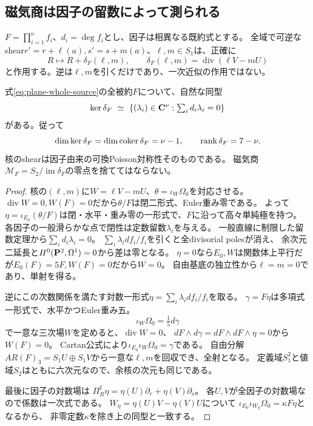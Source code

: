 \subsection{磁気商は因子の留数によって測られる}
$F=\prod_{i=1}^{\nu}f_i$、$d_i=\deg f_i$とし、因子は相異なる既約式とする。
全域で可逆なshear$r'=r+\ell(a),s'=s+m(a)$、$\ell,m\in S_1$は、正確に
\[
 R\longmapsto R+\delta_F(\ell,m),\qquad
 \delta_F(\ell,m)=\operatorname{div}(\ell V-mU)
\]
と作用する。逆は$\ell,m$を引くだけであり、一次近似の作用ではない。
\begin{theorem}[磁気shearの核と因子留数]\label{thm:magnetic-residue-quotient}
式\eqref{eq:plane-whole-source}の全被約$F$について、自然な同型
\begin{equation}
 \ker\delta_F\ \simeq\
 \{(\lambda_i)\in\mathbf C^\nu:\textstyle\sum_i d_i\lambda_i=0\}
                                                        \label{eq:magnetic-residues}
\end{equation}
がある。従って
\[
 \dim\ker\delta_F=\dim\operatorname{coker}\delta_F=\nu-1,
 \qquad\operatorname{rank}\delta_F=7-\nu.
\]
核のshearは因子由来の可換Poisson対称性そのものである。
磁気商$\mathcal M_F=S_2/\operatorname{im}\delta_F$の零点を捨ててはならない。
\end{theorem}
\begin{proof}
核の$(\ell,m)$に$W=\ell V-mU$、$\theta=\iota_W\Omega_0$を対応させる。
$\operatorname{div}W=0,W(F)=0$だから$\theta/F$は閉二形式、Euler重み零である。
よって$\eta=\iota_{E_0}(\theta/F)$は閉・水平・重み零の一形式で、$F$に沿って高々単純極を持つ。
各因子の一般滑らかな点で閉性は定数留数$\lambda_i$を与える。
一般直線に制限した留数定理から$\sum_i d_i\lambda_i=0$。
$\sum_i\lambda_i df_i/f_i$を引くと全divisorial polesが消え、
余次元二延長と$H^0(\mathbf P^2,\Omega^1)=0$から差は零となる。
$\eta=0$なら$E_0,W$は関数体上平行だが$E_0(F)=5F,W(F)=0$だから$W=0$。
自由基底の独立性から$\ell=m=0$であり、単射を得る。

逆にこの次数関係を満たす対数一形式$\eta=\sum_i\lambda_i df_i/f_i$を取る。
$\gamma=F\eta$は多項式一形式で、水平かつEuler重み五。
\[
 \iota_W\Omega_0=\tfrac15d\gamma
\]
で一意な三次場$W$を定めると、$\operatorname{div}W=0$、
$dF\wedge d\gamma=dF\wedge dF\wedge\eta=0$から$W(F)=0$。
Cartan公式により$\iota_{E_0}\iota_W\Omega_0=\gamma$である。
自由分解$AR(F)_3=S_1U\oplus S_1V$から一意な$\ell,m$を回収でき、全射となる。
定義域$S_1^2$と値域$S_2$はともに六次元なので、余核の次元も同じである。

最後に因子の対数場は
$\Pi_R^\sharp\eta=\eta(U)\partial_r+\eta(V)\partial_s$。
各$U,V$が全因子の対数場なので係数は一次式である。
$W_\eta=\eta(U)V-\eta(V)U$について
$\iota_{E_0}\iota_{W_\eta}\Omega_0=\kappa F\eta$となるから、
非零定数$\kappa$を除き上の同型と一致する。
\end{proof}

